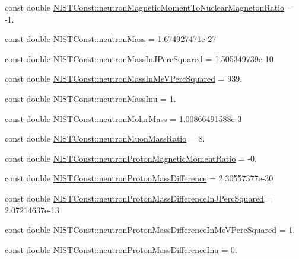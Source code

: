 \begin{DoxyCompactItemize}
const double \mbox{\hyperlink{group___n_i_s_t_const-_neutron_ga6ee94c226124c9b64617ed473e78902a}{N\+I\+S\+T\+Const\+::neutron\+Magnetic\+Moment\+To\+Nuclear\+Magneton\+Ratio}} = -\/1.
\item 
const double \mbox{\hyperlink{group___n_i_s_t_const-_neutron_ga74edcc04e59f152b2afa0fdba8683383}{N\+I\+S\+T\+Const\+::neutron\+Mass}} = 1.\+674927471e-\/27
\item 
const double \mbox{\hyperlink{group___n_i_s_t_const-_neutron_ga28892913d6ed40673a170941f79bb86e}{N\+I\+S\+T\+Const\+::neutron\+Mass\+In\+J\+Perc\+Squared}} = 1.\+505349739e-\/10
\item 
const double \mbox{\hyperlink{group___n_i_s_t_const-_neutron_ga53f986a22e4dcb31cc8ed8151fd18a8e}{N\+I\+S\+T\+Const\+::neutron\+Mass\+In\+Me\+V\+Perc\+Squared}} = 939.
\item 
const double \mbox{\hyperlink{group___n_i_s_t_const-_neutron_ga7931fb41eb5f1acf4b94d9d6b92ca4c3}{N\+I\+S\+T\+Const\+::neutron\+Mass\+Inu}} = 1.
\item 
const double \mbox{\hyperlink{group___n_i_s_t_const-_neutron_ga0f7ab7fc272f54c17ecf777efff7003b}{N\+I\+S\+T\+Const\+::neutron\+Molar\+Mass}} = 1.\+00866491588e-\/3
\item 
const double \mbox{\hyperlink{group___n_i_s_t_const-_neutron_ga91ae8b70076ca6001d2141d1df72a39c}{N\+I\+S\+T\+Const\+::neutron\+Muon\+Mass\+Ratio}} = 8.
\item 
const double \mbox{\hyperlink{group___n_i_s_t_const-_neutron_ga98c2f64e48dbd352a997b82d8815daba}{N\+I\+S\+T\+Const\+::neutron\+Proton\+Magnetic\+Moment\+Ratio}} = -\/0.
\item 
const double \mbox{\hyperlink{group___n_i_s_t_const-_neutron_ga95ef0427b50433511707f0949fc503b9}{N\+I\+S\+T\+Const\+::neutron\+Proton\+Mass\+Difference}} = 2.\+30557377e-\/30
\item 
const double \mbox{\hyperlink{group___n_i_s_t_const-_neutron_gaa89b2b23475d809d4d3a4c46e7556b71}{N\+I\+S\+T\+Const\+::neutron\+Proton\+Mass\+Difference\+In\+J\+Perc\+Squared}} = 2.\+07214637e-\/13
\item 
const double \mbox{\hyperlink{group___n_i_s_t_const-_neutron_gae96854e1fcd14f08cc92a060c6690730}{N\+I\+S\+T\+Const\+::neutron\+Proton\+Mass\+Difference\+In\+Me\+V\+Perc\+Squared}} = 1.
\item 
const double \mbox{\hyperlink{group___n_i_s_t_const-_neutron_ga570caff89957976a8486d25e5288df51}{N\+I\+S\+T\+Const\+::neutron\+Proton\+Mass\+Difference\+Inu}} = 0.

\end{DoxyCompactItemize}
